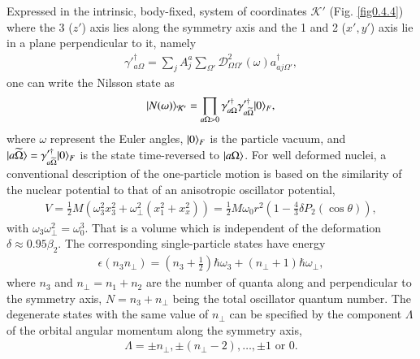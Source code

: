 Expressed in the intrinsic, body-fixed, system of coordinates $\mathcal K'$ (Fig. \ref{fig0.4.4}) where the 3 ($z'$) axis lies along the symmetry axis and the 1 and 2 ($x',y'$) axis lie in a plane perpendicular to it, namely
\begin{align}\label{eq0.4.6}
\gamma'^{\dagger}_{a\Omega}=\sum_jA_j^a\sum_{\Omega'}\mathcal D_{\Omega\Omega'}^2(\omega)a^\dagger_{aj\Omega'},
\end{align}
one can write the Nilsson state as 
\begin{align}\label{eq0.4.7}
|{N(\omega)} \rangle_{\mathcal K'}=\prod_{a\Omega>0}\gamma'^{\dagger}_{a\Omega}\gamma'^{\dagger}_{a\widetilde\Omega}|{0} \rangle_F,
\end{align}
where $\omega$ represent the Euler angles, $|{0} \rangle_F$ is the particle vacuum, and $|{a\widetilde\Omega} \rangle=\gamma'^{\dagger}_{a\widetilde\Omega}|{0} \rangle_F$ is the state time-reversed to $|{a\Omega} \rangle$. For well deformed nuclei, a conventional description of the one-particle motion is based on the similarity of the nuclear potential to that of an anisotropic oscillator potential, 
\begin{align}\label{eq0.4.8}
V=\frac{1}{2}M\left(\omega_3^2x_3^2+\omega^2_{\perp}(x_1^2+x_x^2)\right)=\frac{1}{2}M\omega_0r^2\left(1-\frac{4}{3}\delta P_2(\cos\theta)\right),
\end{align}
with $\omega_3\omega_{\perp}^2=\omega_0^3$. That is a volume which is independent of the deformation $\delta\approx0.95\beta_2$. The corresponding single-particle states have energy
\begin{align}\label{eq0.4.9}
\epsilon(n_3n_{\perp})=(n_3+\tfrac{1}{2})\hbar\omega_3+(n_{\perp}+1)\hbar\omega_{\perp},
\end{align}
where $n_3$ and $n_{\perp}=n_1+n_2$ are the number of quanta along and perpendicular to the symmetry axis, $N=n_3+n_{\perp}$ being the total oscillator quantum number. The degenerate states with the same value of $n_{\perp}$ can be specified by the component $\Lambda$ of the orbital angular momentum along the symmetry axis,
\begin{align}\label{eq0.4.10}
\Lambda=\pm n_{\perp}, \pm(n_{\perp}-2),\dots,\pm 1\text{ or } 0.
\end{align}

